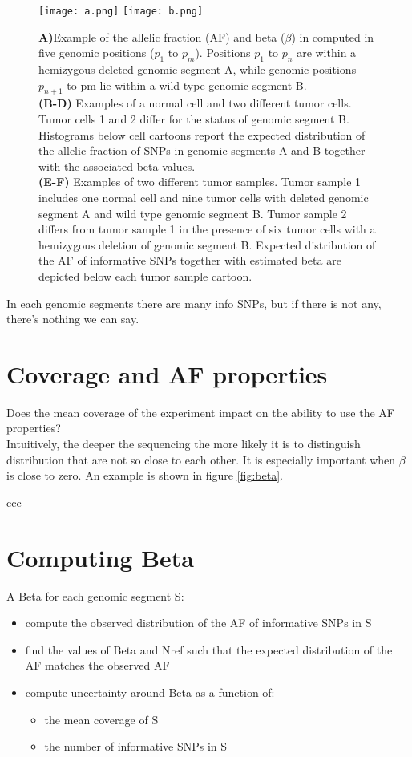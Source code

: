 \begin{figure}[H]
	\centering
	\texttt{[image: a.png]}
	\texttt{[image: b.png]}
	\caption{\label{fig:a_b}
	\textbf{A)}Example of the allelic fraction (AF) and beta ($\beta$) in computed in five genomic positions ($p_1$ to $p_m$). Positions $p_1$ to $p_n$ are within a hemizygous deleted genomic segment A, while genomic positions $p_{n+1}$ to pm lie within a wild type genomic segment B.\\
\textbf{(B-D)} Examples of a normal cell and two different tumor cells. Tumor cells 1 and 2 differ for the status of genomic segment B. Histograms below cell cartoons report the expected distribution of the allelic fraction of SNPs in genomic segments A and B together with the associated beta values.\\
\textbf{(E-F)} Examples of two different tumor samples. Tumor sample 1 includes one normal cell and nine tumor cells with deleted genomic segment A and wild type genomic segment B. Tumor sample 2 differs from tumor sample 1 in the presence of six tumor cells with a hemizygous deletion of genomic segment B.
Expected distribution of the AF of informative SNPs together with estimated beta are depicted below each tumor sample cartoon.}
\end{figure}

In each genomic segments there are many info SNPs, but if there is not any, there's nothing we can say.

\section{Coverage and AF properties}
Does the mean coverage of the experiment impact on the ability to use the AF properties?\\
Intuitively, the deeper the sequencing the more likely it is to distinguish distribution that are not so close to each other. It is especially important when $\beta$ is close to zero. An example is shown in figure \ref{fig:beta}.

ccc

\section{Computing Beta}
A Beta for each genomic segment S:
\begin{itemize}
\item compute the observed distribution of the AF of
informative SNPs in S
\item find the values of Beta and Nref such that the expected
distribution of the AF matches the observed AF
\item compute uncertainty around Beta as a function of:
	\begin{itemize}
	\item the mean coverage of S
	\item the number of informative SNPs in S
	\end{itemize}
\end{itemize}

